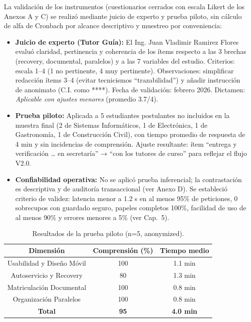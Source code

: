 
La validación de los instrumentos (cuestionarios cerrados con escala Likert de los Anexos A y C) se realizó mediante juicio de experto y prueba piloto, sin cálculo de alfa de Cronbach por alcance descriptivo y muestreo por conveniencia:

\begin{itemize}
    \item \textbf{Juicio de experto (Tutor Guía):} El Ing. Juan Vladimir Ramirez Flores evaluó claridad, pertinencia y coherencia de los ítems respecto a las 3 brechas (recovery, documental, paralelos) y a las 7 variables del estudio. Criterios: escala 1--4 (1 no pertinente, 4 muy pertinente). Observaciones: simplificar redacción ítems 3--4 (evitar tecnicismos “trazabilidad”) y añadir instrucción de anonimato (C.I. como ****). Fecha de validación: febrero 2026. Dictamen: \textit{Aplicable con ajustes menores} (promedio 3.7/4).
    \item \textbf{Prueba piloto:} Aplicada a 5 estudiantes postulantes no incluidos en la muestra final (2 de Sistemas Informáticos, 1 de Electrónica, 1 de Gastronomía, 1 de Construcción Civil), con tiempo promedio de respuesta de 4 min y sin incidencias de comprensión. Ajuste resultante: ítem “entrega y verificación … en secretaría” → “con los tutores de curso” para reflejar el flujo V2.0.
    \item \textbf{Confiabilidad operativa:} No se aplicó prueba inferencial; la contrastación es descriptiva y de auditoría transaccional (ver Anexo D). Se estableció criterio de validez: latencia menor a 1.2 s en al menos 95\% de peticiones, 0 sobrecupos con guardado seguro, papeles completos 100\%, facilidad de uso de al menos 90\% y errores menores a 5\% (ver Cap.~5).
\end{itemize}

\begin{table}[htbp]
    \centering
    \caption{Resultados de la prueba piloto (n=5, anonymized).}
    \label{tab:piloto_validacion}
    \begin{tabularx}{\textwidth}{C C C}
        \toprule
        \textbf{Dimensión} & \textbf{Comprensión (\%)} & \textbf{Tiempo medio} \\
        \midrule
        Usabilidad y Diseño Móvil & 100 & 1.1 min \\
        Autoservicio y Recovery & 80 & 1.3 min \\
        Matriculación Documental & 100 & 0.8 min \\
        Organización Paralelos & 100 & 0.8 min \\
        \midrule
        \textbf{Total} & \textbf{95} & \textbf{4.0 min} \\
        \bottomrule
    \end{tabularx}
\end{table}
